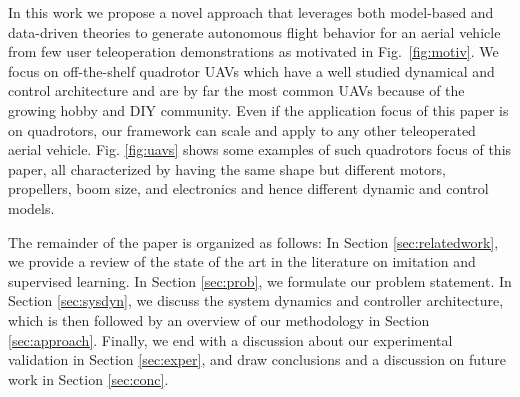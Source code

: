 \documentclass[letterpaper, 10 pt, conference]{ieeeconf}  %
\newcommand\NB[1]{$\spadesuit$\footnote{NB: #1}}
\begin{document}
In this work we propose a novel approach that leverages both model-based and data-driven theories to generate autonomous flight behavior for an aerial vehicle from few user teleoperation demonstrations as motivated in Fig.~\ref{fig:motiv}. 
We focus on off-the-shelf quadrotor UAVs which have a well studied dynamical and control architecture and are by far the most common UAVs because of the growing hobby and DIY community. Even if the application focus of this paper is on quadrotors, our framework can scale and apply to any other teleoperated aerial vehicle. Fig. \ref{fig:uavs} shows some examples of such quadrotors focus of this paper, all characterized by having the same shape but different motors, propellers, boom size, and electronics and hence different dynamic and control models.



The remainder of the paper is organized as follows: In Section \ref{sec:relatedwork}, we provide a review of the state of the art in the literature on imitation and supervised learning. In Section \ref{sec:prob}, we formulate our problem statement. In Section \ref{sec:sysdyn}, we discuss the system dynamics and controller architecture, which is then followed by an overview of our methodology in Section \ref{sec:approach}. Finally, we end with a discussion about our experimental validation in Section \ref{sec:exper}, and draw conclusions and a discussion on future work in Section \ref{sec:conc}.

 
 
\end{document}
